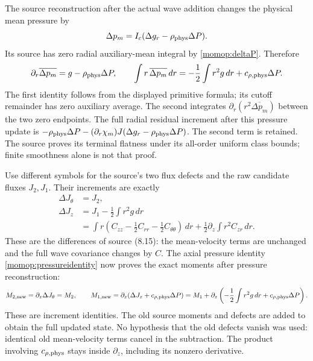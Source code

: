 \documentclass[11pt]{article}
\begin{document}
The source reconstruction after the actual wave addition changes the
physical mean pressure by
\[
 \Delta p_m=I_c(\Delta g_r-\rho_{\rm phys}\Delta P).
\]
Its source has zero radial auxiliary-mean integral by
\eqref{momop:deltaP}. Therefore
\begin{equation}\label{momop:pressureidentity}
 \partial_r\overline{\Delta p_m}
     =g-\rho_{\rm phys}\Delta P,\qquad
 \int r\,\overline{\Delta p_m}\,dr
     =-\frac12\int r^2g\,dr+c_{\rho,\rm phys}\Delta P .
\end{equation}
The first identity follows from the displayed primitive formula;
its cutoff remainder has zero auxiliary average. The second integrates
$\partial_r(r^2\overline{\Delta p_m})$ between the two zero endpoints.
The full radial residual increment after this pressure update is
$-\rho_{\rm phys}\Delta P-
(\partial_r\chi_m)J(\Delta g_r-\rho_{\rm phys}\Delta P)$.
The second term is retained. The source proves its terminal flatness
under its all-order uniform class bounds; finite smoothness alone is
not that proof.

Use different symbols for the source's two flux defects and the raw
candidate fluxes $J_2,J_1$. Their increments are exactly
\begin{align}
 \Delta J_\theta&=J_2,\nonumber\\
 \Delta J_z&=J_1-\frac12\int r^2g\,dr\nonumber\\
 &=\int r\left(C_{zz}-\frac12C_{rr}
                         -\frac12C_{\theta\theta}\right)\,dr
                    +\frac12\partial_z\int r^2C_{zr}\,dr .
 \label{momop:defectdictionary}
\end{align}
These are the differences of source (8.15): the mean-velocity terms
are unchanged and the full wave covariance changes by $C$.
The axial pressure identity \eqref{momop:pressureidentity} now proves
the exact moments after pressure reconstruction:
\begin{equation}\label{momop:afterpressure}
 M_{2,\rm new}=\partial_z\Delta J_\theta=M_2,\qquad
 M_{1,\rm new}=\partial_z(\Delta J_z+c_{\rho,\rm phys}\Delta P)
  =M_1+\partial_z\left(-\frac12\int r^2g\,dr
                                      +c_{\rho,\rm phys}\Delta P\right).
\end{equation}
These are increment identities. The old source moments and defects
are added to obtain the full updated state. No hypothesis that the
old defects vanish was used: identical old mean-velocity terms
cancel in the subtraction. The product involving $c_{\rho,\rm phys}$
stays inside $\partial_z$, including its nonzero derivative.
\end{document}

